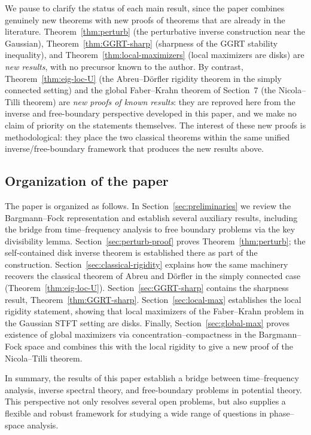 \documentclass[a4paper,11pt,reqno]{amsart}
\numberwithin{equation}{section}
\theoremstyle{plain} %
\theoremstyle{definition} %
\theoremstyle{remark}
\begin{document}
We pause to clarify the status of each main result, since the paper combines genuinely new theorems with new proofs of theorems that are already in the literature. Theorem~\ref{thm:perturb} (the perturbative inverse construction near the Gaussian), Theorem~\ref{thm:GGRT-sharp} (sharpness of the GGRT stability inequality), and Theorem~\ref{thm:local-maximizers} (local maximizers are disks) are \emph{new results}, with no precursor known to the author. By contrast, Theorem~\ref{thm:eig-loc-U} (the Abreu--D\"orfler rigidity theorem in the simply connected setting) and the global Faber--Krahn theorem of Section~7 (the Nicola--Tilli theorem) are \emph{new proofs of known results}: they are reproved here from the inverse and free-boundary perspective developed in this paper, and we make no claim of priority on the statements themselves. The interest of these new proofs is methodological: they place the two classical theorems within the same unified inverse/free-boundary framework that produces the new results above.

\subsection{Organization of the paper}

The paper is organized as follows. In Section~\ref{sec:preliminaries} we review the Bargmann--Fock representation and establish several auxiliary results, including the bridge from time--frequency analysis to free boundary problems via the key divisibility lemma. Section~\ref{sec:perturb-proof} proves Theorem~\ref{thm:perturb}; the self-contained disk inverse theorem is established there as part of the construction. Section~\ref{sec:classical-rigidity} explains how the same machinery recovers the classical theorem of Abreu and D\"orfler in the simply connected case (Theorem~\ref{thm:eig-loc-U}). Section~\ref{sec:GGRT-sharp} contains the sharpness result, Theorem~\ref{thm:GGRT-sharp}. Section~\ref{sec:local-max} establishes the local rigidity statement, showing that local maximizers of the Faber--Krahn problem in the Gaussian STFT setting are disks. Finally, Section~\ref{sec:global-max} proves existence of global maximizers via concentration--compactness in the Bargmann--Fock space and combines this with the local rigidity to give a new proof of the Nicola--Tilli theorem.

\medskip

In summary, the results of this paper establish a bridge between time--frequency analysis, inverse spectral theory, and free-boundary problems in potential theory. This perspective not only resolves several open problems, but also supplies a flexible and robust framework for studying a wide range of questions in phase--space analysis.
\end{document}
